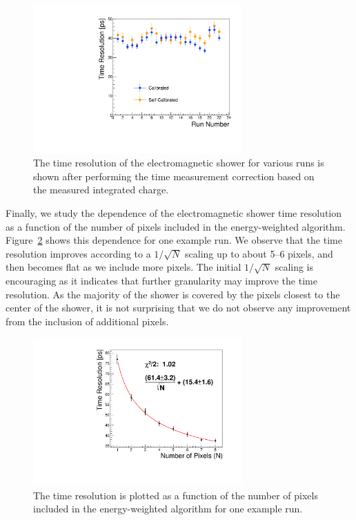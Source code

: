 \documentclass[12pt]{article}
\begin{document}
\begin{figure}[htbp] 
\centering
\includegraphics[width=8cm]{Images/calibtres/timerescalib.pdf} 
\caption{ The time resolution of the electromagnetic shower for various runs is
shown after performing the time measurement correction based on the measured
integrated charge. } 
\label{fig:calib} 
\end{figure} 

Finally, we study the dependence of the electromagnetic shower time resolution
as a function of the number of pixels included in the energy-weighted algorithm.
Figure~\ref{fig:sqrtN} shows this dependence for one example run. We observe
that the time resolution improves according to a $1/\sqrt{N}$ scaling up to
about 5--6 pixels, and then becomes flat as we include more pixels. The
initial $1/\sqrt{N}$ scaling is encouraging as it indicates that further
granularity may improve the time resolution. As the majority of the shower is
covered by the pixels closest to the center of the shower, it is not surprising
that we do not observe any improvement from the inclusion of additional pixels.

\begin{figure}[htbp]
  \centering
  \includegraphics[width=8cm]{Images/sqrtN/t1065_run_38_Dt_IWP.pdf}
  \caption{ The time resolution is plotted as a function of the number of pixels
    included in the energy-weighted algorithm for one example run. }
  \label{fig:sqrtN}
\end{figure}
\end{document}
